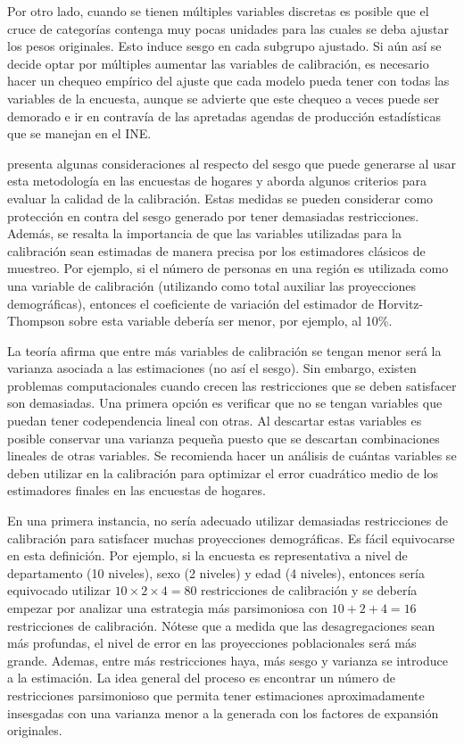 \documentclass[
  10pt,
  spanish,
]{book}
\begin{document}
Por otro lado, cuando se tienen múltiples variables discretas es posible que el cruce de categorías contenga muy pocas unidades para las cuales se deba ajustar los pesos originales. Esto induce sesgo en cada subgrupo ajustado. Si aún así se decide optar por múltiples aumentar las variables de calibración, es necesario hacer un chequeo empírico del ajuste que cada modelo pueda tener con todas las variables de la encuesta, aunque se advierte que este chequeo a veces puede ser demorado e ir en contravía de las apretadas agendas de producción estadísticas que se manejan en el INE.

\citet{Silva_2004} presenta algunas consideraciones al respecto del sesgo que puede generarse al usar esta metodología en las encuestas de hogares y aborda algunos criterios para evaluar la calidad de la calibración. Estas medidas se pueden considerar como protección en contra del sesgo generado por tener demasiadas restricciones. Además, se resalta la importancia de que las variables utilizadas para la calibración sean estimadas de manera precisa por los estimadores clásicos de muestreo. Por ejemplo, si el número de personas en una región es utilizada como una variable de calibración (utilizando como total auxiliar las proyecciones demográficas), entonces el coeficiente de variación del estimador de Horvitz-Thompson sobre esta variable debería ser menor, por ejemplo, al 10\%.

La teoría afirma que entre más variables de calibración se tengan menor será la varianza asociada a las estimaciones (no así el sesgo). Sin embargo, existen problemas computacionales cuando crecen las restricciones que se deben satisfacer son demasiadas. Una primera opción es verificar que no se tengan variables que puedan tener codependencia lineal con otras. Al descartar estas variables es posible conservar una varianza pequeña puesto que se descartan combinaciones lineales de otras variables. Se recomienda hacer un análisis de cuántas variables se deben utilizar en la calibración para optimizar el error cuadrático medio de los estimadores finales en las encuestas de hogares.

En una primera instancia, no sería adecuado utilizar demasiadas restricciones de calibración para satisfacer muchas proyecciones demográficas. Es fácil equivocarse en esta definición. Por ejemplo, si la encuesta es representativa a nivel de departamento (10 niveles), sexo (2 niveles) y edad (4 niveles), entonces sería equivocado utilizar \(10 \times 2 \times 4 = 80\) restricciones de calibración y se debería empezar por analizar una estrategia más parsimoniosa con \(10 + 2 + 4 = 16\) restricciones de calibración. Nótese que a medida que las desagregaciones sean más profundas, el nivel de error en las proyecciones poblacionales será más grande. Ademas, entre más restricciones haya, más sesgo y varianza se introduce a la estimación. La idea general del proceso es encontrar un número de restricciones parsimonioso que permita tener estimaciones aproximadamente insesgadas con una varianza menor a la generada con los factores de expansión originales.
\end{document}
